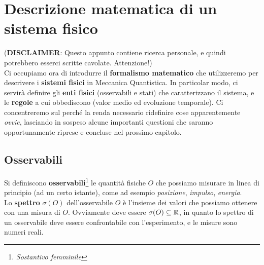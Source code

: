 \documentclass[FisicaTeorica.tex]{subfiles}
\begin{document}
\chapter{Descrizione matematica di un sistema fisico}
\vspace{-1em}
(\textbf{DISCLAIMER}: Questo appunto contiene ricerca personale, e quindi potrebbero esserci scritte cavolate. Attenzione!) \\ 
Ci occupiamo ora di introdurre il \textbf{formalismo matematico} che utilizzeremo per descrivere i \textbf{sistemi fisici} in Meccanica Quantistica. In particolar modo, ci servirà definire gli \textbf{enti fisici} (osservabili e stati) che caratterizzano il sistema, e le \textbf{regole} a cui obbediscono (valor medio ed evoluzione temporale). Ci concentreremo sul perché la \MQ  renda necessario ridefinire cose apparentemente \textit{ovvie}, lasciando in sospeso alcune importanti questioni che saranno opportunamente riprese e concluse nel prossimo capitolo.\\
\section{Osservabili}
Si definiscono \textbf{osservabili}\footnote{\textit{Sostantivo femminile}}  le quantità fisiche $O$ che possiamo misurare in linea di principio (ad un certo istante), come ad esempio \textit{posizione}, \textit{impulso}, \textit{energia}.\\
Lo \textbf{spettro} $\sigma(O)$ dell'osservabile $O$ è l'insieme dei valori che possiamo ottenere con una misura di $O$. Ovviamente deve essere $\sigma(O) \subseteq \mathbb{R}$, in quanto lo spettro di un osservabile deve essere confrontabile con l'esperimento, e le misure sono numeri reali.\\
\end{document}
